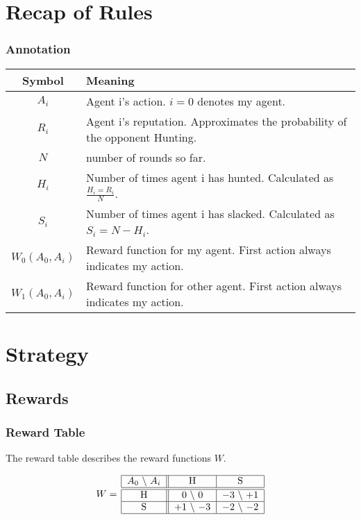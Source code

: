 \documentclass[10pt,fleqn]{article}
\begin{document}
\section{Recap of Rules}

\subsubsection{Annotation}

\begin{tabular}{|c|l|}
  \hline
  Symbol & Meaning \\
  \hline \hline
  $A_i$ & Agent i's action. $i = 0$ denotes my agent. \\
  \hline
  $R_i$ & Agent i's reputation. Approximates the probability of the opponent Hunting. \\
  \hline
  $N$ & number of rounds so far. \\
  \hline
  $H_i$ & Number of times agent i has hunted. Calculated as $\frac{H_i = R_i}{N}$. \\
  \hline
  $S_i$ & Number of times agent i has slacked. Calculated as $S_i = N - H_i$. \\
  \hline
  $W_0(A_0, A_i)$ & Reward function for my agent. First action always indicates
  my action. \\
  \hline
  $W_1(A_0, A_i)$ & Reward function for other agent. First action always indicates
  my action. \\
  \hline
\end{tabular}

\section{Strategy}

\subsection{Rewards}

\subsubsection{Reward Table}
The reward table describes the reward functions $W$.

\begin{figure}[h!]
  \centering
  \begin{equation*}
    W =\, 
      \begin{tabular}{|c||c|c|}
        \hline
        $A_0$ \textbackslash\ $A_i$ & H & S \\
        \hline\hline
        H & $0$ \textbackslash\ $0$ & $-3$ \textbackslash\ $+1$ \\
        \hline
        S & $+1$ \textbackslash\ $-3$ & $-2$ \textbackslash\ $-2$ \\
        \hline
      \end{tabular}
  \end{equation*}
\end{figure}
\end{document}

